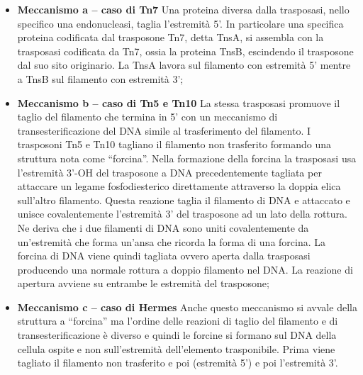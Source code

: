 \documentclass[]{article}
\begin{document}
\begin{itemize}
\item
  \textbf{Meccanismo a -- caso di Tn7} Una proteina diversa dalla
  trasposasi, nello specifico una endonucleasi, taglia l'estremità 5'.
  In particolare una specifica proteina codificata dal trasposone Tn7,
  detta TnsA, si assembla con la trasposasi codificata da Tn7, ossia la
  proteina TnsB, escindendo il trasposone dal suo sito originario. La
  TnsA lavora sul filamento con estremità 5' mentre a TnsB sul filamento
  con estremità 3';
\item
  \textbf{Meccanismo b -- caso di Tn5 e Tn10} La stessa trasposasi
  promuove il taglio del filamento che termina in 5' con un meccanismo
  di transesterificazione del DNA simile al trasferimento del filamento.
  I trasposoni Tn5 e Tn10 tagliano il filamento non trasferito formando
  una struttura nota come ``forcina''. Nella formazione della forcina la
  trasposasi usa l'estremità 3'-OH del trasposone a DNA precedentemente
  tagliata per attaccare un legame fosfodiesterico direttamente
  attraverso la doppia elica sull'altro filamento. Questa reazione
  taglia il filamento di DNA e attaccato e unisce covalentemente
  l'estremità 3' del trasposone ad un lato della rottura. Ne deriva che
  i due filamenti di DNA sono uniti covalentemente da un'estremità che
  forma un'ansa che ricorda la forma di una forcina. La forcina di DNA
  viene quindi tagliata ovvero aperta dalla trasposasi producendo una
  normale rottura a doppio filamento nel DNA. La reazione di apertura
  avviene su entrambe le estremità del trasposone;
\item
  \textbf{Meccanismo c -- caso di Hermes} Anche questo meccanismo si
  avvale della struttura a ``forcina'' ma l'ordine delle reazioni di
  taglio del filamento e di transesterificazione è diverso e quindi le
  forcine si formano sul DNA della cellula ospite e non sull'estremità
  dell'elemento trasponibile. Prima viene tagliato il filamento non
  trasferito e poi (estremità 5') e poi l'estremità 3'.
\end{itemize}
\end{document}
